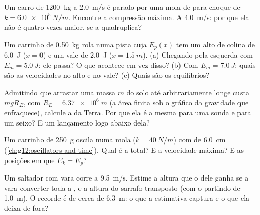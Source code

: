 \begin{exercise}[$\star\star$]\label{exo:g12:work-and-energy:11}
Um carro de \qty{1200}{kg} a \qty{2.0}{m/s} é parado por uma mola de para-choque de
 $k = \qty{6.0e5}{N/m}$. Encontre a compressão máxima. A
\qty{4.0}{m/s}: por que ela não é quatro vezes maior, se a  quadruplica?
\end{exercise}

\begin{exercise}[$\star\star\star$]\label{exo:g12:work-and-energy:12}
Um carrinho de \qty{0.50}{kg} rola numa pista cuja $E_p(x)$ tem um alto de colina de
\qty{6.0}{J} ($x = 0$) e um vale de \qty{2.0}{J} ($x = \qty{1.5}{m}$). (a) Chegando
pela esquerda com $E_m = \qty{5.0}{J}$: ele passa? O que acontece em vez disso? (b) Com
$E_m = \qty{7.0}{J}$: quais são as velocidades no alto e no vale? (c) Quais são os
equilíbrios?
\end{exercise}

\begin{exercise}[$\star\star\star$]\label{exo:g12:work-and-energy:13}
Admitindo que arrastar uma massa $m$ do solo até arbitrariamente longe custa $mgR_E$,
com $R_E = \qty{6.37e6}{m}$ (a área finita sob o gráfico da gravidade que enfraquece),
calcule a \emph{} da Terra. Por que ela é a mesma para uma sonda e
para um seixo? E um lançamento logo abaixo dela?
\end{exercise}

\begin{exercise}[$\star\star\star$]\label{exo:g12:work-and-energy:14}
Um carrinho de \qty{250}{g} oscila numa mola ($k = \qty{40}{N/m}$) com  de
\qty{6.0}{cm} (\cref{ch:g12:oscillators-and-time}). Qual é a  total? E a
velocidade máxima? E as posições em que $E_k = E_p$?
\end{exercise}

\begin{exercise}[$\star\star\star$]\label{exo:g12:work-and-energy:15}
Um saltador com vara corre a \qty{9.5}{m/s}. Estime a altura que o  dele
ganha se a vara converter toda a , e a altura do sarrafo transposto
(com o  partindo de \qty{1.0}{m}). O recorde é de cerca de \qty{6.3}{m}:
o que a estimativa captura e o que ela deixa de fora?
\end{exercise}

